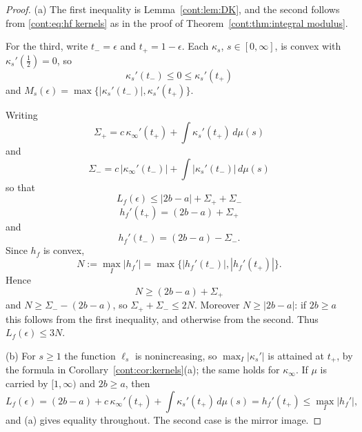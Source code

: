 \begin{proof}
(a) The first inequality is Lemma~\ref{cont:lem:DK}, and the second follows from \eqref{cont:eq:hf kernels} as in the proof of Theorem~\ref{cont:thm:integral modulus}.

For the third, write $t_-=\epsilon$ and $t_+=1-\epsilon$. Each $\kappa_s$, $s\in[0,\infty]$, is convex with $\kappa_s'(\frac12)=0$, so \[\kappa_s'(t_-)\leq0\leq\kappa_s'(t_+)\] and $M_s(\epsilon)=\max\{|\kappa_s'(t_-)|,\kappa_s'(t_+)\}$.

Writing \[\Sigma_{+}=c\,\kappa_\infty'(t_+)+\int\kappa_s'(t_+)\,d\mu(s)\] and \[\Sigma_{-}=c\,|\kappa_\infty'(t_-)|+\int|\kappa_s'(t_-)|\,d\mu(s)\] so that \[L_f(\epsilon)\leq|2b-a|+\Sigma_{+}+\Sigma_{-}\] \[h_f'(t_+)=(2b-a)+\Sigma_{+}\] and \[h_f'(t_-)=(2b-a)-\Sigma_{-}.\] Since $h_f$ is convex,
\[
N:=\max_I|h_f'|=\max\{|h_f'(t_-)|,|h_f'(t_+)|\}.
\]
Hence \[N\geq(2b-a)+\Sigma_{+}\] and $N\geq \Sigma_{-}-(2b-a)$, so $\Sigma_{+}+\Sigma_{-}\leq2N$. Moreover $N\geq|2b-a|$: if $2b\geq a$ this follows from the first inequality, and otherwise from the second. Thus $L_f(\epsilon)\leq3N$.
 
(b) For $s\geq1$ the function $\ell_s$ is nonincreasing, so $\max_I|\kappa_s'|$ is attained at $t_+$, by the formula in Corollary~\ref{cont:cor:kernels}(a); the same holds for $\kappa_\infty$. If $\mu$ is carried by $[1,\infty)$ and $2b\geq a$, then
\[
L_f(\epsilon)=(2b-a)+c\,\kappa_\infty'(t_+)+\int\kappa_s'(t_+)\,d\mu(s)=h_f'(t_+)\leq\max_I|h_f'|,
\]
and (a) gives equality throughout. The second case is the mirror image.
 

\end{proof}
